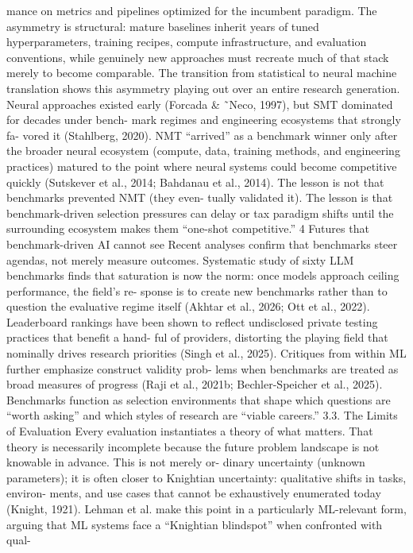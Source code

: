 mance on metrics and pipelines optimized for the incumbent
paradigm. The asymmetry is structural: mature baselines
inherit years of tuned hyperparameters, training recipes,
compute infrastructure, and evaluation conventions, while
genuinely new approaches must recreate much of that stack
merely to become comparable.
The transition from statistical to neural machine translation
shows this asymmetry playing out over an entire research
generation. Neural approaches existed early (Forcada \&
˜Neco, 1997), but SMT dominated for decades under bench-
mark regimes and engineering ecosystems that strongly fa-
vored it (Stahlberg, 2020). NMT “arrived” as a benchmark
winner only after the broader neural ecosystem (compute,
data, training methods, and engineering practices) matured
to the point where neural systems could become competitive
quickly (Sutskever et al., 2014; Bahdanau et al., 2014). The
lesson is not that benchmarks prevented NMT (they even-
tually validated it). The lesson is that benchmark-driven
selection pressures can delay or tax paradigm shifts until the
surrounding ecosystem makes them “one-shot competitive.”
4
Futures that benchmark-driven AI cannot see
Recent analyses confirm that benchmarks steer agendas,
not merely measure outcomes. Systematic study of sixty
LLM benchmarks finds that saturation is now the norm:
once models approach ceiling performance, the field’s re-
sponse is to create new benchmarks rather than to question
the evaluative regime itself (Akhtar et al., 2026; Ott et al.,
2022). Leaderboard rankings have been shown to reflect
undisclosed private testing practices that benefit a hand-
ful of providers, distorting the playing field that nominally
drives research priorities (Singh et al., 2025). Critiques
from within ML further emphasize construct validity prob-
lems when benchmarks are treated as broad measures of
progress (Raji et al., 2021b; Bechler-Speicher et al., 2025).
Benchmarks function as selection environments that shape
which questions are “worth asking” and which styles of
research are “viable careers.”
3.3. The Limits of Evaluation
Every evaluation instantiates a theory of what matters. That
theory is necessarily incomplete because the future problem
landscape is not knowable in advance. This is not merely or-
dinary uncertainty (unknown parameters); it is often closer
to Knightian uncertainty: qualitative shifts in tasks, environ-
ments, and use cases that cannot be exhaustively enumerated
today (Knight, 1921). Lehman et al. make this point in a
particularly ML-relevant form, arguing that ML systems
face a “Knightian blindspot” when confronted with qual-
